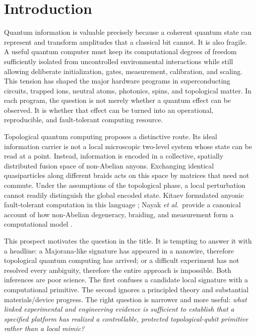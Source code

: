 \documentclass[conference]{IEEEtran}
\begin{document}
\section{Introduction}

Quantum information is valuable precisely because a coherent quantum state can represent and transform amplitudes that a classical bit cannot. It is also fragile. A useful quantum computer must keep its computational degrees of freedom sufficiently isolated from uncontrolled environmental interactions while still allowing deliberate initialization, gates, measurement, calibration, and scaling. This tension has shaped the major hardware programs in superconducting circuits, trapped ions, neutral atoms, photonics, spins, and topological matter. In each program, the question is not merely whether a quantum effect can be observed. It is whether that effect can be turned into an operational, reproducible, and fault-tolerant computing resource.

Topological quantum computing proposes a distinctive route. Its ideal information carrier is not a local microscopic two-level system whose state can be read at a point. Instead, information is encoded in a collective, spatially distributed fusion space of non-Abelian anyons. Exchanging identical quasiparticles along different braids acts on this space by matrices that need not commute. Under the assumptions of the topological phase, a local perturbation cannot readily distinguish the global encoded state. Kitaev formulated anyonic fault-tolerant computation in this language \cite{kitaev2003}; Nayak \textit{et al.}\ provide a canonical account of how non-Abelian degeneracy, braiding, and measurement form a computational model \cite{nayak2008}.

This prospect motivates the question in the title. It is tempting to answer it with a headline: a Majorana-like signature has appeared in a nanowire, therefore topological quantum computing has arrived; or a difficult experiment has not resolved every ambiguity, therefore the entire approach is impossible. Both inferences are poor science. The first confuses a candidate local signature with a computational primitive. The second ignores a principled theory and substantial materials/device progress. The right question is narrower and more useful: \emph{what linked experimental and engineering evidence is sufficient to establish that a specified platform has realized a controllable, protected topological-qubit primitive rather than a local mimic?}
\end{document}
